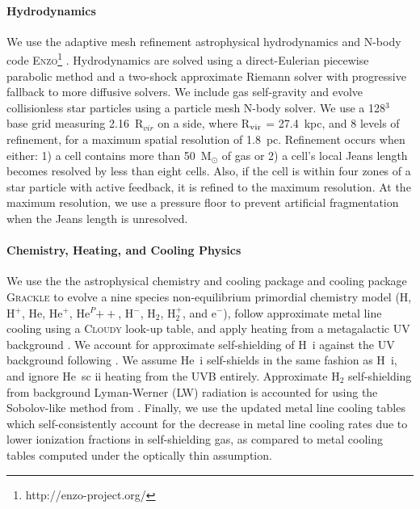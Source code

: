 \documentclass[twocolumn]{aastex61}
\begin{document}
\paragraph{Hydrodynamics} We use the adaptive mesh refinement astrophysical hydrodynamics and N-body code \textsc{Enzo}\footnote{http://enzo-project.org/} \citep{Enzo2014}. Hydrodynamics are solved using a direct-Eulerian piecewise parabolic method and a two-shock approximate Riemann solver with progressive fallback to more diffusive solvers. We include gas self-gravity and evolve collisionless star particles using a particle mesh N-body solver. We use a 128$^{3}$ base grid measuring 2.16~R$_{vir}$ on a side, where R$_{\rm vir}$ = 27.4~kpc, and 8 levels of refinement, for a maximum spatial resolution of 1.8~pc. Refinement occurs when either: 1) a cell contains more than 50~M$_{\odot}$ of gas or 2) a cell's local Jeans length becomes resolved by less than eight cells. Also, if the cell is within four zones of a star particle with active feedback, it is refined to the maximum resolution. At the maximum resolution, we use a pressure floor to prevent artificial fragmentation when the Jeans length is unresolved.

\paragraph{Chemistry, Heating, and Cooling Physics} We use the the astrophysical chemistry and cooling package and cooling package \textsc{Grackle} \citep{GrackleMethod} to evolve a nine species non-equilibrium primordial chemistry model (H, H$^+$, He, He$^+$, He$^P{++}$, H$^-$, H$_2$, H$_2^+$, and e$^-$), follow approximate metal line cooling using a \textsc{Cloudy} look-up table, and apply heating from a metagalactic UV background \citep{HM2012}. We account for approximate self-shielding of H~{\sc i} against the UV background following \cite{Rahmati2013}. We assume He~{\sc i} self-shields in the same fashion as H~{\sc i}, and ignore He~{sc ii} heating from the UVB entirely. Approximate H$_2$ self-shielding from background Lyman-Werner (LW) radiation is accounted for using the Sobolov-like method from \cite{Wolcott-Green2011}. Finally, we use the updated metal line cooling tables which self-consistently account for the decrease in metal line cooling rates due to lower ionization fractions in self-shielding gas, as compared to metal cooling tables computed under the optically thin assumption.

\end{document}
